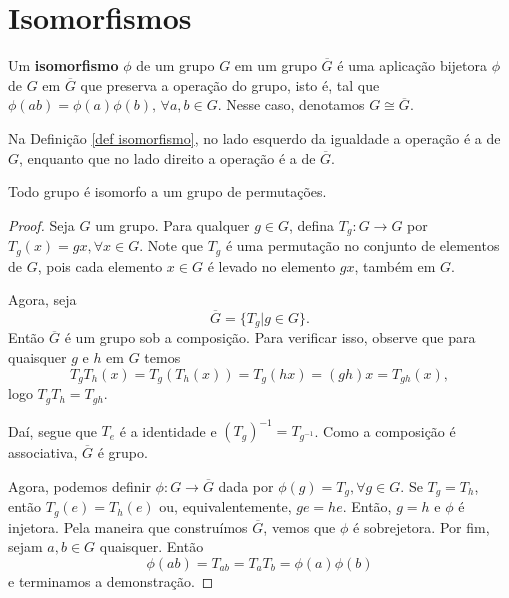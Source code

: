 \section{Isomorfismos}
    \begin{definition}
	\label{def isomorfismo}
		Um \textbf{isomorfismo} $\phi$ de um grupo $G$ em um grupo
		$\overline{G}$ é uma aplicação bijetora $\phi$ de $G$ em
		$\overline{G}$ que preserva a operação do grupo, isto é, 
		tal que $\phi(ab) = \phi(a)\phi(b), \, \forall a,b\in G$.
		Nesse caso, denotamos $G\cong\overline{G}$.
	\end{definition}
	Na Definição \ref{def isomorfismo}, no lado
	esquerdo da igualdade a operação é a de $G$, enquanto que no lado
	direito a operação é a de $\overline{G}$.
	\begin{theorem}
	\label{Cayley}
		Todo grupo é isomorfo a um grupo de permutações.
	\end{theorem}
	\begin{proof}
		Seja $G$ um grupo. Para qualquer $g\in G$, defina $T_g:G\to G$
		por $T_g(x) = gx, \forall x\in G$. Note que $T_g$ é uma
		permutação no conjunto de elementos de $G$, pois cada elemento
		$x\in G$ é levado no elemento $gx$, também em $G$.
		\par\vspace{0.3cm} Agora, seja 
		\begin{equation*}
		    \overline{G} = \{ T_g | g\in G \}.
		\end{equation*}
		Então $\overline{G}$ é um grupo sob a composição. 
		Para verificar isso, observe que para quaisquer $g$ e $h$ em $G$
		temos 
		\begin{equation*}
		    T_gT_h(x) = T_g(T_h(x)) = T_g(hx) = (gh)x = T_{gh}(x), 
        \end{equation*}
		logo $T_gT_h = T_{gh}$.
		\par\vspace{0.3cm} Daí, segue que $T_e$ é a identidade e
		$(T_g)^{-1} = T_{g^{-1}}$. Como a composição é associativa,
		$\overline{G}$ é grupo.
		\par\vspace{0.3cm} Agora, podemos definir 
		$\phi: G\to\overline{G}$ dada por 
		$\phi(g) = T_g, \forall g\in G$. Se $T_g = T_h$, então 
		$T_g(e) = T_h(e)$ ou, equivalentemente, $ge = he$. Então, 
		$g = h$ e $\phi$ é injetora. Pela maneira que construímos
		$\overline{G}$, vemos que $\phi$ é sobrejetora. Por fim, sejam
		$a,b\in G$ quaisquer. Então
		\[
		    \phi(ab) = T_{ab} = T_aT_b = \phi(a)\phi(b)
		\]
		e terminamos a demonstração.
	\end{proof}
